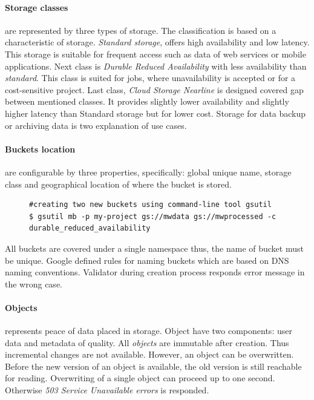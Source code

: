 \documentclass[a4paper,12pt,oneside]{report}
\begin{document}
\paragraph{Storage classes} are represented by three types of storage. The classification is based 
on a characteristic of storage. \textit{Standard storage}, offers high availability and low 
latency. This storage is suitable for frequent access such 
as data of web services or mobile applications.
Next class is \textit{Durable Reduced Availability} with less availability than  \textit{standard}. 
This class is suited for jobs, where unavailability is accepted or for a cost-sensitive project. 
Last class, \textit{Cloud Storage Nearline} is designed 
covered gap between mentioned classes. It provides slightly lower availability and slightly higher 
latency than Standard storage but for lower cost. 
Storage for data backup or archiving data is two explanation of use cases.

\paragraph{Buckets location} are configurable by three properties, specifically: global unique 
name, storage class and geographical location of where the bucket is stored.
\begin{figure}[!htbp]\lstset{extendedchars=false,escapeinside=''}
\begin{lstlisting}[style=mybash]
#creating two new buckets using command-line tool gsutil
$ gsutil mb -p my-project gs://mwdata gs://mwprocessed -c durable_reduced_availability
\end{lstlisting} \end{figure}

All buckets are covered under a single namespace thus, the name of bucket must be unique. 
Google defined rules for naming buckets which are based on DNS naming conventions. Validator 
during creation process responds error message in the wrong case. 

\paragraph{Objects} represents peace of data placed in storage. Object have two components: 
user data and metadata of quality. All \textit{objects} are immutable after creation. Thus 
incremental changes are not available. However, an object 
can be overwritten. Before the new version of an object is available, the old version is still 
reachable for reading. Overwriting of a single object 
can proceed up to one second. Otherwise \textit{503 Service Unavailable errors} is responded.
\end{document}
